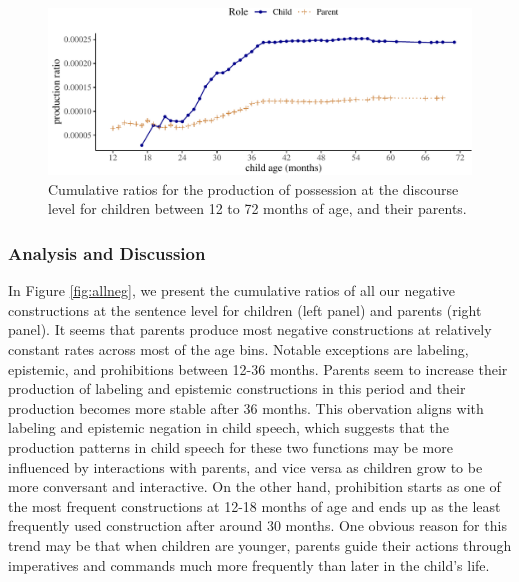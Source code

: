 \documentclass[
  english,
  man,floatsintext]{apa6}
\begin{document}
\begin{figure}[H]

{\centering \includegraphics{neg_construction_article_files/figure-latex/possessiondiscourse-1} 

}

\caption{Cumulative ratios for the production of possession at the discourse level for children between 12 to 72 months of age, and their parents.}\label{fig:possessiondiscourse}
\end{figure}

\hypertarget{analysis-and-discussion}{%
\subsubsection{Analysis and Discussion}\label{analysis-and-discussion}}

In Figure \ref{fig:allneg}, we present the cumulative ratios of all our negative constructions at the sentence level for children (left panel) and parents (right panel).
It seems that parents produce most negative constructions at relatively constant rates across most of the age bins. Notable exceptions are labeling, epistemic, and prohibitions between 12-36 months. Parents seem to increase their production of labeling and epistemic constructions in this period and their production becomes more stable after 36 months. This obervation aligns with labeling and epistemic negation in child speech, which suggests that the production patterns in child speech for these two functions may be more influenced by interactions with parents, and vice versa as children grow to be more conversant and interactive. On the other hand, prohibition starts as one of the most frequent constructions at 12-18 months of age and ends up as the least frequently used construction after around 30 months. One obvious reason for this trend may be that when children are younger, parents guide their actions through imperatives and commands much more frequently than later in the child's life.
\end{document}
